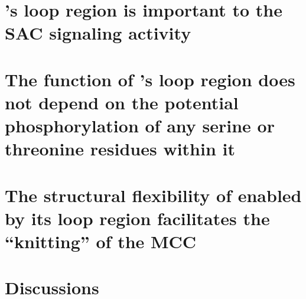 \section{'s loop region is important to the SAC signaling activity }
\label{LoopDeletionSection}

\section{The function of 's loop region does not depend on the potential phosphorylation of any serine or threonine residues within it}

\section{The structural flexibility of  enabled by its loop region facilitates the ``knitting'' of the MCC}
\label{FinalKnittingModel}


\section{Discussions}
\label{Chapter4Discussions}


